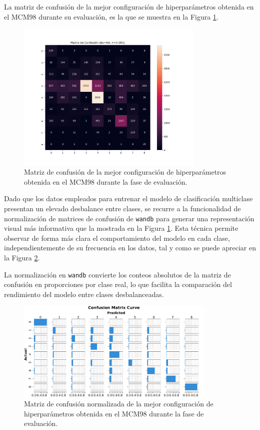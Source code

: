 La matriz de confusión de la mejor configuración de hiperparámetros obtenida en el MCM98 durante su evaluación, es la que se muestra en la Figura \ref{fig:MC_EVAL_MCM98}.

\begin{figure}[H]
    \centering
    \includegraphics[width=0.8\textwidth]{./img/evaluacion/matrices_confusion/MC_EVAL_MCM98.png}
    \caption{Matriz de confusión de la mejor configuración de hiperparámetros obtenida en el MCM98 durante la fase de evaluación.}
    \label{fig:MC_EVAL_MCM98}
\end{figure}

Dado que los datos empleados para entrenar el modelo de clasificación multiclase presentan un elevado desbalance entre clases, se recurre a la funcionalidad de normalización de matrices de confusión de \texttt{wandb} para generar una representación visual más informativa que la mostrada en la Figura \ref{fig:MC_EVAL_MCM98}. Esta técnica permite observar de forma más clara el comportamiento del modelo en cada clase, independientemente de su frecuencia en los datos, tal y como se puede apreciar en la Figura \ref{fig:MCNorm_EVAL_MCM98}.

La normalización en \texttt{wandb} convierte los conteos absolutos de la matriz de confusión en proporciones por clase real, lo que facilita la comparación del rendimiento del modelo entre clases desbalanceadas.

\begin{figure}[H]
    \centering
    \includegraphics[width=0.85\textwidth]{./img/evaluacion/matrices_confusion/MCNorm_EVAL_MCM98.pdf}
    \caption{Matriz de confusión normalizada de la mejor configuración de hiperparámetros obtenida en el MCM98 durante la fase de evaluación.}
    \label{fig:MCNorm_EVAL_MCM98}
\end{figure}




